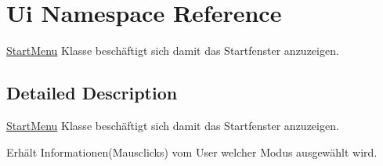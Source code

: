 \hypertarget{namespace_ui}{}\section{Ui Namespace Reference}
\label{namespace_ui}


\hyperlink{class_start_menu}{Start\+Menu} Klasse beschäftigt sich damit das Startfenster anzuzeigen.  




\subsection{Detailed Description}
\hyperlink{class_start_menu}{Start\+Menu} Klasse beschäftigt sich damit das Startfenster anzuzeigen. 

Erhält Informationen(\+Mausclicks) vom User welcher Modus ausgewählt wird. 